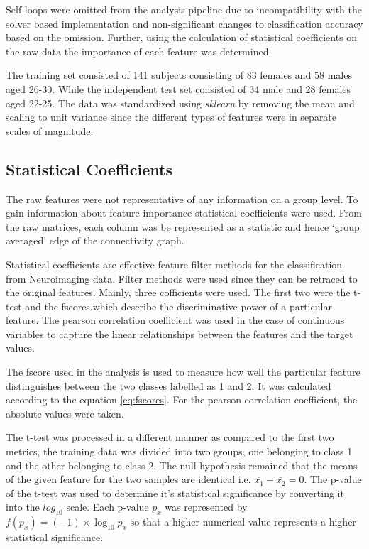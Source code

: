 \documentclass[msthesis.tex]{subfiles}
\begin{document}
Self-loops were omitted from the analysis pipeline due to incompatibility with the solver based implementation and non-significant changes to classification accuracy based on the omission. Further, using the calculation of statistical coefficients on the raw data the importance of each feature was determined. 

The training set consisted of 141 subjects consisting of 83 females and 58 males aged 26-30. While the independent test set consisted of 34 male and 28 females aged 22-25. The data was standardized using \textit{sklearn} by removing the mean and scaling to unit variance since the different types of features were in separate scales of magnitude.

\subsection{Statistical Coefficients}
\label{subsub:statcoef}
The raw features were not representative of any information on a group level. To gain information about feature importance statistical coefficients were used. From the raw matrices, each column was be represented as a statistic and hence `group averaged' edge of the connectivity graph. 

Statistical coefficients are effective feature filter methods for the classification from Neuroimaging data. Filter methods were used since they can be retraced to the original features. Mainly, three cofficients were used. The first two were the t-test and the fscores,which describe the discriminative power of a particular feature. The pearson correlation coefficient was used in the case of continuous variables to capture the linear relationships between the features and the target values. 

The fscore used in the analysis is used to measure how well the particular feature distinguishes between the two classes labelled as 1 and 2. It was calculated according to the equation \autoref{eq:fscores}. For the pearson correlation coefficient, the absolute values were taken.

The t-test was processed in a different manner as compared to the first two metrics, the training data was divided into two groups, one belonging to class 1 and the other belonging to class 2. The null-hypothesis remained that the means of the given feature for the two samples are identical i.e. $\overline{x_{1}} - \overline{x_{2}} = 0$. The p-value of the t-test was used to determine it's statistical significance by converting it into the $log_{10}$ scale. Each p-value $p_x$ was represented by $ f(p_{x}) = (-1) \times \log_{10} p_x$ so that a higher numerical value represents a higher statistical significance.  
\end{document}
